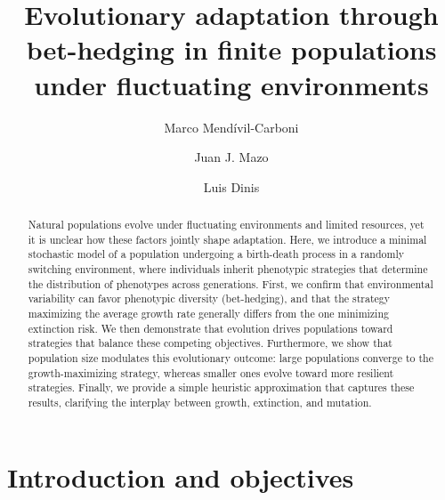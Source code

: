 \documentclass[aps,pre,reprint,10pt,superscriptaddress]{revtex4-2}
\begin{document}
\title{Evolutionary adaptation through bet-hedging in finite populations under fluctuating environments}
\author{Marco Mendívil-Carboni}
\author{Juan J. Mazo}
\author{Luis Dinis}

\begin{abstract}
    Natural populations evolve under fluctuating environments and limited resources, yet it is unclear how these factors jointly shape adaptation. Here, we introduce a minimal stochastic model of a population undergoing a birth-death process in a randomly switching environment, where individuals inherit phenotypic strategies that determine the distribution of phenotypes across generations. First, we confirm that environmental variability can favor phenotypic diversity (bet-hedging), and that the strategy maximizing the average growth rate generally differs from the one minimizing extinction risk. We then demonstrate that evolution drives populations toward strategies that balance these competing objectives. Furthermore, we show that population size modulates this evolutionary outcome: large populations converge to the growth-maximizing strategy, whereas smaller ones evolve toward more resilient strategies. Finally, we provide a simple heuristic approximation that captures these results, clarifying the interplay between growth, extinction, and mutation.
\end{abstract}

\maketitle

\graphicspath{{figures/v2/}}

\section{Introduction and objectives} \label{sec:introduction}
\end{document}
